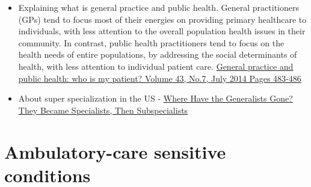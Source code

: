 \documentclass[]{book}
\begin{document}
\begin{itemize}
\item
  Explaining what is general practice and public health. General practitioners (GPs) tend to focus most of their energies on providing primary healthcare to individuals, with less attention to the overall population health issues in their community. In contrast, public health practitioners tend to focus on the health needs of entire populations, by addressing the social determinants of health, with less attention to individual patient care.
  \href{https://www.racgp.org.au/afp/2014/july/who-is-my-patient/}{General practice and public health: who is my patient? Volume 43, No.7, July 2014 Pages 483-486}
\item
  About super specialization in the US - \href{https://www.amjmed.com/article/S0002-9343\%2817\%2930134-1/pdf}{Where Have the Generalists Gone? They Became Specialists, Then Subspecialists}
\end{itemize}

\hypertarget{ambulatory-care-sensitive-conditions}{%
\section*{Ambulatory-care sensitive conditions}\label{ambulatory-care-sensitive-conditions}}
\end{document}
